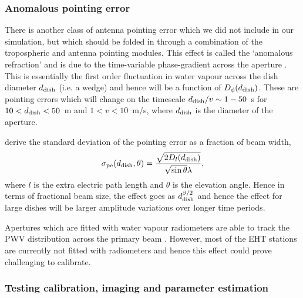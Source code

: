 \subsubsection{Anomalous pointing error}
There is another class of antenna pointing error which we did not include in our simulation, but which should be folded in through a combination of the tropospheric and antenna pointing modules. This effect is called the `anomalous refraction' and is due to the time-variable phase-gradient across the aperture \citep[e.g.][]{Holdaway_1997,Butler_1997,Holdaway_1998}. This is essentially the first order fluctuation in water vapour across the dish diameter $d_{\rm dish}$ (i.e. a wedge) and hence will be a function of $D_{\phi}(d_{\rm dish})$. These are pointing errors which will change on the timescale $d_{\rm dish}/v \sim 1-50$~s for $10<d_{\rm dish}<50$~m and $1<v<10$~m/s, where $d_{\rm dish}$ is the diameter of the aperture.  

\citet{Holdaway_1998} derive the standard deviation of the pointing error as a fraction of beam width,
\begin{equation}
 \sigma_{\rm pe}(d_{\rm dish},\theta) = \frac{\sqrt{2 D_l(d_{\rm dish})}}{\sqrt{\sin\theta}\lambda},
\end{equation}
where $l$ is the extra electric path length and $\theta$ is the elevation angle. Hence in terms of fractional beam size, the effect goes as $d_{\rm dish}^{\beta/2}$ and hence the effect for large dishes will be larger amplitude variations over longer time periods. 



Apertures which are fitted with water vapour radiometers are able to track the PWV distribution across the primary beam \citep{Lamb_1998}. However, most of the EHT stations are currently not fitted with radiometers and hence this effect could prove challenging to calibrate.

\subsubsection{Testing calibration, imaging and parameter estimation}

